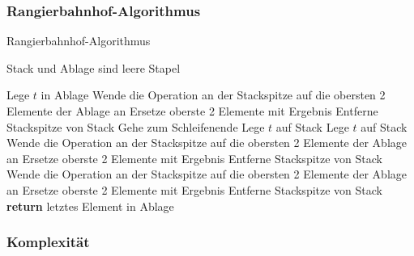 \subsubsection{Rangierbahnhof-Algorithmus}

\begin{algorithm}
\caption{Rangierbahnhof-Algorithmus}
\label{alg:shunt}
\begin{algorithmic}
\State Stack und Ablage sind leere Stapel

    \State Lege $t$ in Ablage
            \State Wende die Operation an der Stackspitze
            \State \quad auf die obersten 2 Elemente der Ablage an
            \State Ersetze oberste 2 Elemente mit Ergebnis
            \State Entferne Stackspitze von Stack
        \Else
            \State Gehe zum Schleifenende
        \EndIf
    \EndWhile
    \State Lege $t$ auf Stack
    \State Lege $t$ auf Stack
        \State Wende die Operation an der Stackspitze
        \State \quad auf die obersten 2 Elemente der Ablage an
        \State Ersetze oberste 2 Elemente mit Ergebnis
        \State Entferne Stackspitze von Stack
    \EndWhile
\EndIf
\EndFor
{}
    \State Wende die Operation an der Stackspitze
    \State \quad auf die obersten 2 Elemente der Ablage an
    \State Ersetze oberste 2 Elemente mit Ergebnis
    \State Entferne Stackspitze von Stack
\EndWhile
\State \textbf{return} letztes Element in Ablage
\end{algorithmic}
\end{algorithm}

\subsubsection{Komplexität}

\
